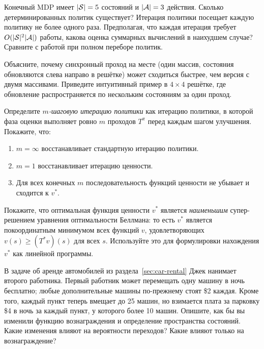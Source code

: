 \begin{exercise}
\label{ex:dp-number-of-policies}
Конечный MDP имеет $|\mathcal{S}|=5$ состояний и $|\mathcal{A}|=3$ действия.  Сколько детерминированных политик существует?  Итерация политики посещает каждую политику не более одного раза.  Предполагая, что каждая итерация требует $O(|\mathcal{S}|^2|\mathcal{A}|)$ работы, какова оценка суммарных вычислений в наихудшем случае?  Сравните с работой при полном переборе политик.
\end{exercise}

\begin{exercise}
\label{ex:dp-async}
Объясните, почему синхронный проход на месте (один массив, состояния обновляются слева направо в решётке) может сходиться быстрее, чем версия с двумя массивами.  Приведите интуитивный пример в $4\times4$ решётке, где обновление распространяется по нескольким состояниям за один проход.
\end{exercise}

\begin{exercise}
\label{ex:dp-truncated}
Определите \emph{$m$-шаговую итерацию политики} как итерацию политики, в которой фаза оценки выполняет ровно $m$ проходов $T^\pi$ перед каждым шагом улучшения.  Покажите, что:
\begin{enumerate}[label=(\alph*)]
  \item $m=\infty$ восстанавливает стандартную итерацию политики.
  \item $m=1$ восстанавливает итерацию ценности.
  \item Для всех конечных $m$ последовательность функций ценности не убывает и сходится к $v^*$.
\end{enumerate}
\end{exercise}

\begin{exercise}
\label{ex:dp-bellman-lp}
Покажите, что оптимальная функция ценности $v^*$ является \emph{наименьшим} супер-решением уравнения оптимальности Беллмана: то есть $v^*$ является покоординатным минимумом всех функций $v$, удовлетворяющих $v(s) \ge (T^* v)(s)$ для всех $s$.  Используйте это для формулировки нахождения $v^*$ как линейной программы.
\end{exercise}

\begin{exercise}
\label{ex:dp-car-rental}
В задаче об аренде автомобилей из раздела~\ref{sec:car-rental} Джек нанимает второго работника.  Первый работник может перемещать одну машину в ночь бесплатно; любые дополнительные машины по-прежнему стоят \$2 каждая.  Кроме того, каждый пункт теперь вмещает до 25 машин, но взимается плата за парковку \$4 в ночь за каждый пункт, у которого более 10 машин.  Опишите, как бы вы изменили функцию вознаграждения и определение пространства состояний.  Какие изменения влияют на вероятности переходов?  Какие влияют только на вознаграждение?
\end{exercise}

